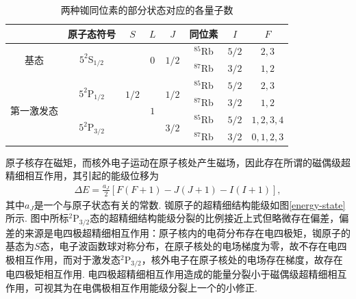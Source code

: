 \documentclass[UTF8,a4paper,10pt]{article}
\begin{document}
\begin{table}[h]
    \centering
    \caption{两种铷同位素的部分状态对应的各量子数}
    \label{quantum-number}
    \begin{tabular}{|c|c|c|c|c|c|c|c|}
    \hline
     & 原子态符号 & $S$ & $L$ & $J$ & 同位素 & $I$ & $F$ \\ \hline
    \multirow{2}{*}{基态} & \multirow{2}{*}{$5^2$S$_{1/2}$} & \multirow{6}{*}{$1/2$} & \multirow{2}{*}{$0$} & \multirow{2}{*}{$1/2$} & $^{85}$Rb & $5/2$ & $2,3$ \\ \cline{6-8} 
     &  &  &  &  & $^{87}$Rb & $3/2$ & $1,2$ \\ \cline{1-2} \cline{4-8} 
    \multirow{4}{*}{第一激发态} & \multirow{2}{*}{$5^2$P$_{1/2}$} &  & \multirow{4}{*}{$1$} & \multirow{2}{*}{$1/2$} & $^{85}$Rb & $5/2$ & $2,3$ \\ \cline{6-8} 
     &  &  &  &  & $^{87}$Rb & $3/2$ & $1,2$ \\ \cline{2-2} \cline{5-8} 
     & \multirow{2}{*}{$5^2$P$_{3/2}$} &  &  & \multirow{2}{*}{$3/2$} & $^{85}$Rb & $5/2$ & $1,2,3,4$ \\ \cline{6-8} 
     &  &  &  &  & $^{87}$Rb & $3/2$ & $0,1,2,3$ \\ \hline
    \end{tabular}
\end{table}

原子核存在磁矩，而核外电子运动在原子核处产生磁场，因此存在所谓的磁偶级超精细相互作用，其引起的能级位移为
\begin{align}
    \Delta E=\frac{a_J}{2}[F(F+1)-J(J+1)-I(I+1)],
\end{align}
其中$a_J$是一个与原子状态有关的常数. 铷原子的超精细结构能级如图\ref{energy-state}所示. 图中所标$^2$P$_{3/2}$态的超精细结构能级分裂的比例接近上式但略微存在偏差，偏差的来源是电四极超精细相互作用：原子核内的电荷分布存在电四极矩，铷原子的基态为$S$态，电子波函数球对称分布，在原子核处的电场梯度为零，故不存在电四极相互作用，而对于激发态$^2$P$_{3/2}$，核外电子在原子核处的电场存在梯度，故存在电四极矩相互作用. 电四极超精细相互作用造成的能量分裂小于磁偶级超精细相互作用，可视其为在电偶极相互作用能级分裂上一个的小修正.
\end{document}
